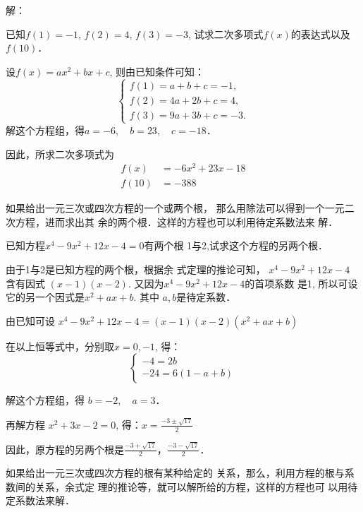 解：


\begin{example}
    已知$f(1)=-1$, $f(2)=4$, $f(3)=-3$,
试求二次多项式$f(x)$的表达式以及$f(10)$．
\end{example}

\begin{solution}
    设$f(x)=ax^2+bx+c$,
则由已知条件可知：
\[\begin{cases}
    f(1)=a+b+c=-1,\\
f(2)=4a+2b+c=4,\\
f(3)=9a+3b+c=-3.
\end{cases}\]
解这个方程组，得$a=-6,\quad b=23,\quad c=-18$．

因此，所求二次多项式为
\[\begin{split}
    f(x)&=-6x^2+23x-18\\
f(10)&=-388
\end{split}\]
\end{solution}

如果给出一元三次或四次方程的一个或两个根，
那么用除法可以得到一个一元二次方程，进而求出其
余的两个根．这样的方程也可以利用待定系数法来
解．


\begin{example}
   已知方程$x^4-9x^2+12x-4=0$有两个根
1与2,试求这个方程的另两个根． 
\end{example}

\begin{analyze}
由于1与2是已知方程的两个根，根据余
式定理的推论可知，
$x^4-9x^2+12x-4$
含有因式
$(x-1)(x-2)$. 又因为$x^4-9x^2+12x-4$的首项系数
是1, 所以可设它的另一个因式是$x^2+ax+b$. 其中
$a,b$是待定系数．
\end{analyze}

\begin{solution}
    由已知可设
$x^4-9x^2+12x-4=(x-1)(x-2)(x^2+ax+b)$

在以上恒等式中，分别取$x=0,-1$, 得：
\[\begin{cases}
    -4=2b\\
-24=6(1-a+b)
\end{cases}\]

解这个方程组，得 $b=-2,\quad a=3$．

再解方程 $x^2+3x-2=0$, 得：$x=\frac{-3\pm\sqrt{17}}{2}$

因此，原方程的另两个根是$\frac{-3+\sqrt{17}}{2}$，$\frac{-3-\sqrt{17}}{2}$．
\end{solution}

如果给出一元三次或四次方程的根有某种给定的
关系，那么，利用方程的根与系数间的关系，余式定
理的推论等，就可以解所给的方程，这样的方程也可
以用待定系数法来解．    

